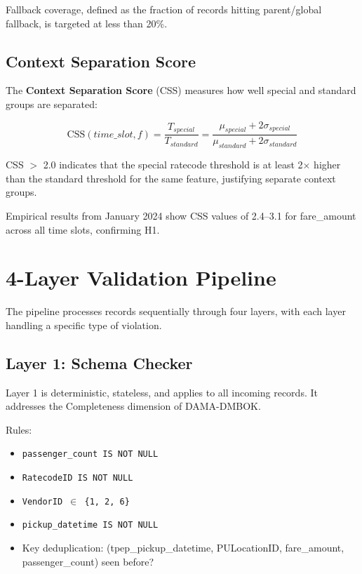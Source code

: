 Fallback coverage, defined as the fraction of records hitting parent/global fallback, is targeted at less than 20\%.

\subsection{Context Separation Score}

The \textbf{Context Separation Score} (CSS) measures how well special and standard groups are separated:

\begin{equation}
\text{CSS}(time\_slot, f) = \frac{T_{special}}{T_{standard}} = \frac{\mu_{special} + 2\sigma_{special}}{\mu_{standard} + 2\sigma_{standard}}
\end{equation}

CSS $>$ 2.0 indicates that the special ratecode threshold is at least 2$\times$ higher than the standard threshold for the same feature, justifying separate context groups.

Empirical results from January 2024 show CSS values of 2.4--3.1 for fare\_amount across all time slots, confirming H1.

\section{4-Layer Validation Pipeline}

The pipeline processes records sequentially through four layers, with each layer handling a specific type of violation.

\subsection{Layer 1: Schema Checker}

Layer 1 is deterministic, stateless, and applies to all incoming records. It addresses the Completeness dimension of DAMA-DMBOK.

Rules:
\begin{itemize}
    \item \texttt{passenger\_count IS NOT NULL}
    \item \texttt{RatecodeID IS NOT NULL}
    \item \texttt{VendorID $\in$ \{1, 2, 6\}}
    \item \texttt{pickup\_datetime IS NOT NULL}
    \item Key deduplication: (tpep\_pickup\_datetime, PULocationID, fare\_amount, passenger\_count) seen before?
\end{itemize}

